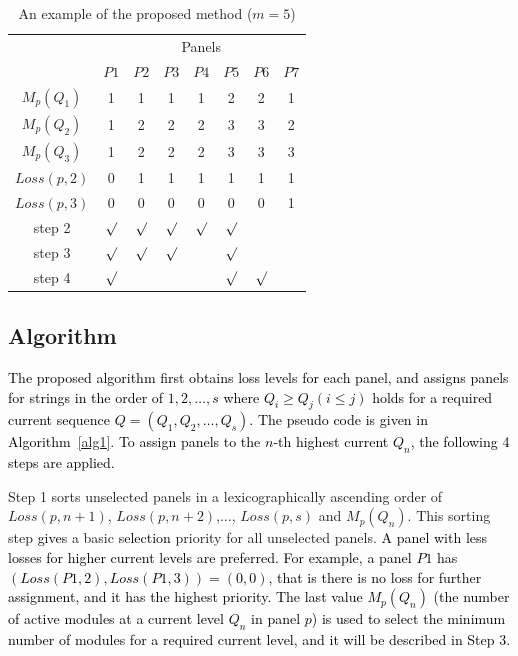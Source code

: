 \documentclass[conference]{pvsctran}
\newcommand{\michiko}{\textcolor{black}}
\begin{document}
\begin{table}[t]
\caption{An example of the proposed method ($m = 5$)}
\begin{center}
\begin{tabular}{c|c|ccccc|c}\hline \hline
                               & \multicolumn{7}{c}{Panels}  \\
                               &  \multicolumn{1}{c}{$P1$}    & $P2$   & $P3$    & $P4$    & $P5$   & \multicolumn{1}{c}{$P6$}            & $P7$             \\ \hline
$M_{p}(Q_1)$        & 1     & 1     & 1     & 1     & 2    & 2    & 1              \\ \hline
$M_{p}(Q_2)$        & 1     & 2     & 2     & 2     & 3    & 3    & 2              \\ \hline
$M_{p}(Q_3)$        & 1     & 2     & 2     & 2     & 3    & 3    & 3              \\ \hline
$Loss(p,2)$           & 0     & 1     & 1     & 1     & 1    & 1    & 1    \\ \hline
$Loss(p,3)$           & 0     & 0     & 0     & 0     & 0    & 0    & 1    \\ \hline\hline
step 2        & $\surd$ & $\surd$ &$\surd$ &$\surd$ &$\surd$ & & \\ \hline
step 3      & $\surd$ & $\surd$ &$\surd$ & &$\surd$ & & \\ \hline
step 4       & $\surd$ &  & & &$\surd$ & $\surd$ & \\ \hline         
\end{tabular}
\end{center}
\label{tab:proposed-example}
\end{table}

\subsection{Algorithm}
\michiko{The proposed algorithm first obtains loss levels for each panel, and assigns panels for strings in the order of $1,2,\ldots ,s$ where $Q_{i} \geq Q_{j} (i \leq j)$ holds for a required current sequence $Q = (Q_{1},Q_{2},\ldots ,Q_{s})$. The pseudo code is given in Algorithm~\ref{alg1}.
To assign panels to the $n$-th highest current $Q_{n}$, the following 4 steps are applied.}

Step 1 sorts unselected panels in a lexicographically ascending order of $Loss(p,n+1)$, $Loss(p,n+2)$,$\ldots$, $Loss(p,s)$ and $M_{p}(Q_{n})$.
This sorting step \michiko{gives} a basic \michiko{selection} priority for all unselected panels. 
\michiko{A panel with less losses for higher current levels are preferred. For example, a panel $P1$ has $(Loss(P1,2), Loss(P1,3)) = (0,0)$, that is there is no loss for further assignment, and it has the highest priority. The last value $M_{p}(Q_{n})$ (the number of active modules at a current level $Q_{n}$ in panel $p$) is used to select the minimum number of modules for a required current level, and it will be described in Step 3.}
\end{document}
